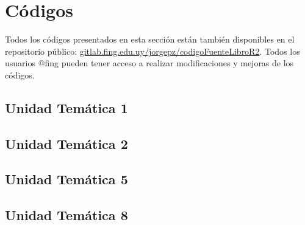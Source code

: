 
\chapter{Códigos}

Todos los códigos presentados en esta sección están también disponibles en el repositorio público:
\href{https://gitlab.fing.edu.uy/jorgepz/codigoFuenteLibroR2}{gitlab.fing.edu.uy/jorgepz/codigoFuenteLibroR2}. %
%
Todos los usuarios @fing pueden tener acceso a realizar modificaciones y mejoras de los códigos.


\section{Unidad Temática 1}




\section{Unidad Temática 2}














\section{Unidad Temática 5} \label{sec:codut5}



%
%	
%

\section{Unidad Temática 8}


    